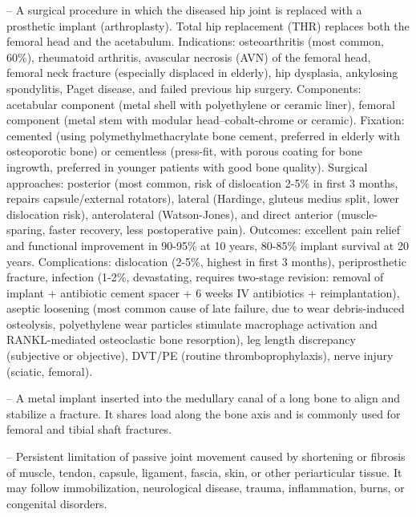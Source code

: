 -- A surgical procedure in which the diseased hip joint is replaced with a prosthetic implant (arthroplasty). Total hip replacement (THR) replaces both the femoral head and the acetabulum. Indications: osteoarthritis (most common, 60\%), rheumatoid arthritis, avascular necrosis (AVN) of the femoral head, femoral neck fracture (especially displaced in elderly), hip dysplasia, ankylosing spondylitis, Paget disease, and failed previous hip surgery. Components: acetabular component (metal shell with polyethylene or ceramic liner), femoral component (metal stem with modular head--cobalt-chrome or ceramic). Fixation: cemented (using polymethylmethacrylate bone cement, preferred in elderly with osteoporotic bone) or cementless (press-fit, with porous coating for bone ingrowth, preferred in younger patients with good bone quality). Surgical approaches: posterior (most common, risk of dislocation 2-5\% in first 3 months, repairs capsule/external rotators), lateral (Hardinge, gluteus medius split, lower dislocation risk), anterolateral (Watson-Jones), and direct anterior (muscle-sparing, faster recovery, less postoperative pain). Outcomes: excellent pain relief and functional improvement in 90-95\% at 10 years, 80-85\% implant survival at 20 years. Complications: dislocation (2-5\%, highest in first 3 months), periprosthetic fracture, infection (1-2\%, devastating, requires two-stage revision: removal of implant + antibiotic cement spacer + 6 weeks IV antibiotics + reimplantation), aseptic loosening (most common cause of late failure, due to wear debris-induced osteolysis, polyethylene wear particles stimulate macrophage activation and RANKL-mediated osteoclastic bone resorption), leg length discrepancy (subjective or objective), DVT/PE (routine thromboprophylaxis), nerve injury (sciatic, femoral).

-- A metal implant inserted into the medullary canal of a long bone to align and stabilize a fracture. It shares load along the bone axis and is commonly used for femoral and tibial shaft fractures.

-- Persistent limitation of passive joint movement caused by shortening or fibrosis of muscle, tendon, capsule, ligament, fascia, skin, or other periarticular tissue. It may follow immobilization, neurological disease, trauma, inflammation, burns, or congenital disorders.

